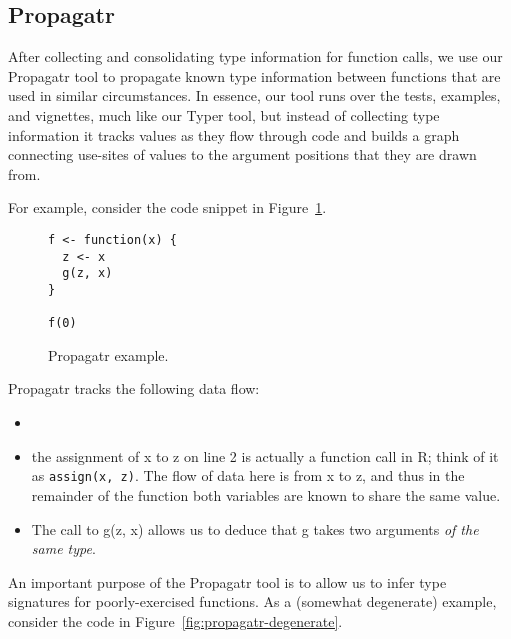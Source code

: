 \documentclass[sigplan,10pt,review,anonymous]{acmart}\settopmatter{printfolios=true,printccs=false,printacmref=false}
\begin{document}

%
%
%
%
\subsection{Propagatr}

After collecting and consolidating type information for function calls, we use our Propagatr tool to propagate known type information between functions that are used in similar circumstances.
In essence, our tool runs over the tests, examples, and vignettes, much like our Typer tool, but instead of collecting type information it tracks values as they flow through code and builds a graph connecting use-sites of values to the argument positions that they are drawn from.

For example, consider the code snippet in Figure~\ref{fig:propagatr-example}.

\begin{figure}[!hb]{\small\begin{lstlisting}[style=R]
f <- function(x) {
  z <- x
  g(z, x)
}

f(0)
\end{lstlisting}}\caption{Propagatr example.}\label{fig:propagatr-example}\end{figure}

Propagatr tracks the following data flow:

\begin{itemize}
\item {}
\item the assignment of x to z on line 2 is actually a function call in R; think of it as {\tt assign(x, z)}.
The flow of data here is from x to z, and thus in the remainder of the function both variables are known to share the same value.
\item The call to g(z, x) allows us to deduce that g takes two arguments {\it of the same type}. 
\end{itemize}

An important purpose of the Propagatr tool is to allow us to infer type signatures for poorly-exercised functions.
As a (somewhat degenerate) example, consider the code in Figure~\ref{fig:propagatr-degenerate}.
\end{document}
